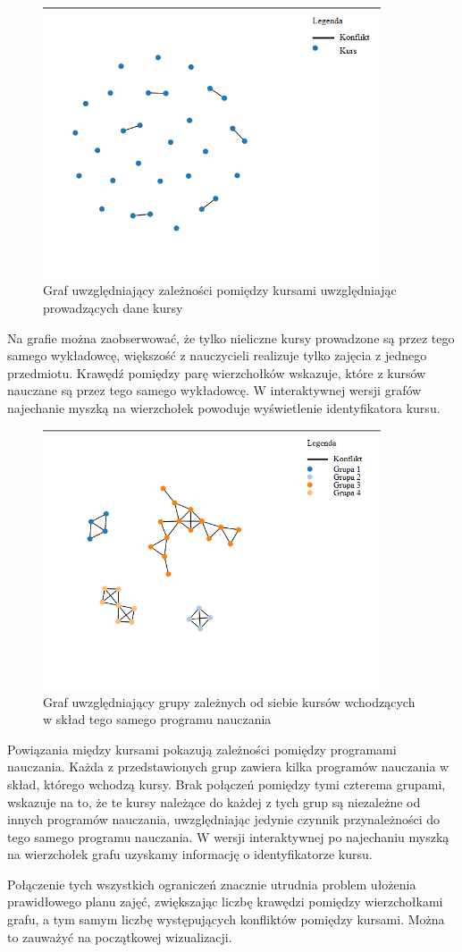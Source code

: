 \begin{figure}[H]
  \caption{Graf uwzględniający zależności pomiędzy kursami uwzględniając prowadzących dane kursy}
  \centering
    \includegraphics[width=10cm]{test1_teach.PNG}
\end{figure}
Na grafie można zaobserwować, że tylko nieliczne kursy prowadzone są przez tego samego wykładowcę, większość z nauczycieli realizuje tylko zajęcia z jednego przedmiotu. Krawędź pomiędzy parę wierzchołków wskazuje, które z kursów nauczane są przez tego samego wykładowcę. W interaktywnej wersji grafów najechanie myszką na wierzchołek powoduje wyświetlenie identyfikatora kursu.
\begin{figure}[H]
  \caption{Graf uwzględniający grupy zależnych od siebie kursów wchodzących w skład tego samego programu nauczania}
  \centering
    \includegraphics[width=10cm]{test1_con.PNG}
\end{figure}
\par Powiązania między kursami pokazują zależności pomiędzy programami nauczania. Każda z przedstawionych grup zawiera kilka programów nauczania w skład, którego wchodzą kursy. Brak połączeń pomiędzy tymi czterema grupami, wskazuje na to, że te kursy należące do każdej z tych grup są niezależne od innych programów nauczania, uwzględniając jedynie czynnik przynależności do tego samego programu nauczania. W wersji interaktywnej po najechaniu myszką na wierzchołek grafu uzyskamy informację o identyfikatorze kursu.
\par Połączenie tych wszystkich ograniczeń znacznie utrudnia problem ułożenia prawidłowego planu zajęć, zwiększając liczbę krawędzi pomiędzy wierzchołkami grafu, a tym samym liczbę występujących konfliktów pomiędzy kursami. Można to zauważyć na początkowej wizualizacji.

